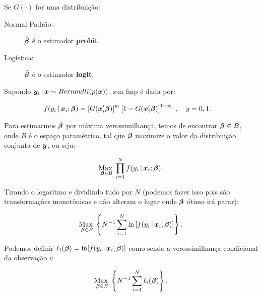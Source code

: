 \documentclass[11pt, oneside, a4paper, article]{article}
\numberwithin{equation}{section}
\begin{document}
\begin{description}
\begin{description}
Se $G(\cdot)$ for uma distribuição:

\begin{description}
	\item [Normal Padrão:] $\hat{\boldsymbol{\beta}}$ é o estimador \textbf{probit}.
	\item [Logística:] $\hat{\boldsymbol{\beta}}$ é o estimador \textbf{logit}.
\end{description}

Supondo $\boldsymbol{y}_{i} \, | \, \boldsymbol{x} \sim Bernoulli(p(\boldsymbol{x}))$, sua fmp é dada por:

\vspace{-1 em}
\begin{align*}
f( y_{i} \, | \, \boldsymbol{x}_{i} ; \boldsymbol{\beta} ) 
&= 
\left[ G(\boldsymbol{x}_{i}' \boldsymbol{\beta} )  \right]^{y_{i}}
\left[ 1 - G(\boldsymbol{x}_{i}' \boldsymbol{\beta} )  \right]^{1 - y_{i}}
\; , \quad y=0,1.
\end{align*}

Para estimarmos $\hat{\boldsymbol{\beta}}$ por máxima verossimilhança, temos de encontrar $\boldsymbol{\beta} \in B$, onde $B$ é o espaço paramétrico, tal que $\boldsymbol{\beta}$ maximize o valor da distribuição conjunta de $\boldsymbol{y}$, ou seja:

\vspace{-1 em}
\begin{align*}
	\underset{\boldsymbol{\beta} \in B}{\text{Max }} 
	\prod_{i=1}^{N}
	f( y_{i} \, | \, \boldsymbol{x}_{i} ; \boldsymbol{\beta} ).
\end{align*}

\noindent

Tirando o logaritmo e dividindo tudo por $N$ (podemos fazer isso pois são transformações monotônicas e não alteram o lugar onde $\boldsymbol{\beta}$ ótimo irá parar):

\vspace{-1 em}
\begin{align*}
\underset{\boldsymbol{\beta} \in B}{\text{Max }} 
\left\{ 
N^{-1} \sum_{i=1}^{N}
\ln \left[ f( y_{i} \, | \, \boldsymbol{x}_{i} ; \boldsymbol{\beta} ) \right]
\right\}.
\end{align*}

\noindent
Podemos definir
$\ell_{i}( \boldsymbol{\beta} ) = \ln[ f( y_{i} \, | \, \boldsymbol{x}_{i} ; \boldsymbol{\beta} ) ]$
como sendo a verossimilhança condicional da observação $i$:

\vspace{-1 em}
\begin{align*}
\underset{\boldsymbol{\beta} \in B}{\text{Max }} 
\left\{ 
N^{-1} \sum_{i=1}^{N} \ell_{i} (\boldsymbol{\beta})
\right\}.
\end{align*}


\end{description}
\end{description}
\end{document}
